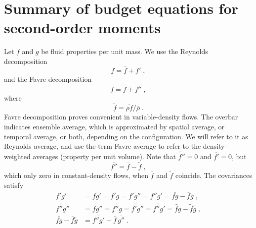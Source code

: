 \section{Summary of budget equations for second-order moments}

\newcommand{\pt}[2] {\partial_{#2}{#1}}
\newcommand{\ptp}[2]{\partial_{#2}\left(#1\right)}
\newcommand{\dvp}[1]{\nabla\negmedspace\cdot\negthinspace\left(#1\right)}
\newcommand{\dv} [1]{\nabla\negmedspace\cdot\negthinspace#1}
\newcommand{\avr}[1]{\overline{#1}}
\newcommand{\avf}[1]{\widetilde{#1}}

Let $f$ and $g$ be fluid properties per unit mass. We use the Reynolds decomposition
\begin{equation}
  f = \avr{f}+f' \;,
\end{equation}
and the Favre decomposition
\begin{equation}
  f = \avf{f}+f'' \;,
\end{equation}
where
\begin{equation}
  \avf{f} = \avr{\rho f}/\avr{\rho} \;.
\end{equation}
Favre decomposition proves convenient in variable-density flows. The overbar indicates ensemble average, which is approximated by spatial average, or temporal average, or both, depending on the  configuration. We will refer to it as Reynolds average, and use the term Favre average to refer to the density-weighted averages (property per unit volume). Note that $\avf{f''}=0$ and $\avr{f'}=0$, but
\begin{equation}
  \avr{f''}=\avr{f}-\avf{f} \;,
\end{equation}
which only zero in constant-density flows, when $\avr{f}$ and $\avf{f}$ coincide.
The covariances satisfy
\begin{align}
  \avr{f'g'}   &= \avr{fg'}  =\avr{f'g}  =\avr{f'g''} =\avr{f''g'} =\avr{fg}-\avr{f}\avr{g} \;,\\
  \avf{f''g''} &= \avf{fg''} =\avf{f''g} =\avf{f'g''} =\avf{f''g'} =\avf{fg}-\avf{f}\avf{g} \;,\\
  \avr{fg}-\avr{f}\avf{g} &=\avr{f''g'}-\avr{f}\,\avr{g''}\;.
\end{align}

